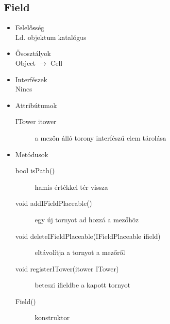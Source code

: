 \subsection{Field}
\begin{itemize}
\item Felelősség\\
Ld. objektum katalógus
\item Ősosztályok\\
Object $\rightarrow$ Cell
\item Interfészek\\
Nincs
\item Attribútumok\\
	\begin{description}
		\item[ITower itower] a mezőn álló torony interfészű elem tárolása

		
	\end{description}
\item Metódusok\\
	\begin{description}
		
		\item[bool isPath()] hamis értékkel tér vissza
		\item[void addIFieldPlaceable()] egy új tornyot ad hozzá a mezőhöz
		\item[void deleteIFieldPlaceable(IFieldPlaceable ifield)] eltávolítja a tornyot a mezőről
		\item[void registerITower(itower ITower)] beteszi ifieldbe a kapott tornyot
		\item[Field()] konstruktor
		
		
	\end{description}
\end{itemize}



